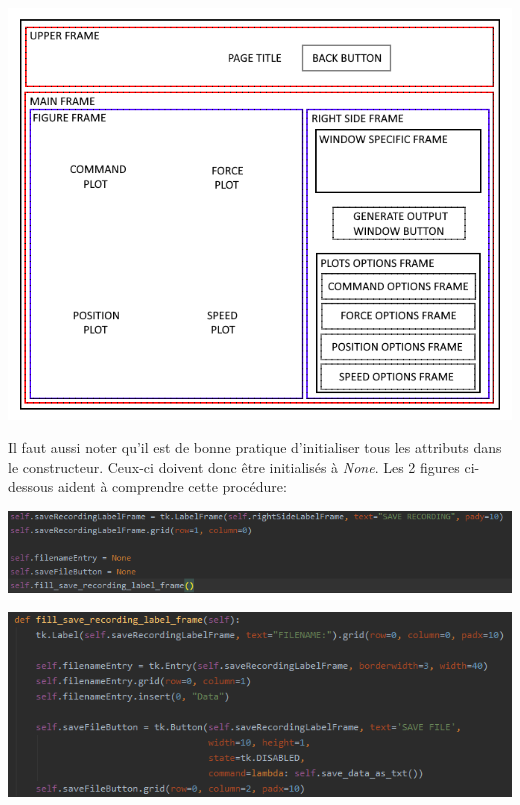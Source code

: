 \begin{center}
    \includegraphics[width=15cm]{images/DrawPlotsParent-schematic.png}
    \label{fig:schemaDrawPlotsParent}
\end{center}

Il faut aussi noter qu'il est de bonne pratique d'initialiser tous les attributs dans le constructeur. Ceux-ci doivent donc être initialisés à \textit{None}. Les 2 figures ci-dessous aident à comprendre cette procédure:

\begin{center}
    \includegraphics[width=15cm]{images/code1.png}
    
    \includegraphics[width=15cm]{images/code2.png}
\end{center}


